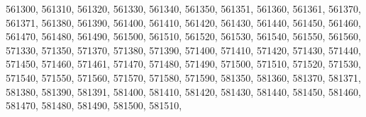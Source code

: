 \textquotesingle{}561300\textquotesingle{}, \textquotesingle{}561310\textquotesingle{}, \textquotesingle{}561320\textquotesingle{}, \textquotesingle{}561330\textquotesingle{}, \textquotesingle{}561340\textquotesingle{}, \textquotesingle{}561350\textquotesingle{}, \textquotesingle{}561351\textquotesingle{}, \textquotesingle{}561360\textquotesingle{}, \textquotesingle{}561361\textquotesingle{}, \textquotesingle{}561370\textquotesingle{}, \textquotesingle{}561371\textquotesingle{}, \textquotesingle{}561380\textquotesingle{}, \textquotesingle{}561390\textquotesingle{}, \textquotesingle{}561400\textquotesingle{}, \textquotesingle{}561410\textquotesingle{}, \textquotesingle{}561420\textquotesingle{}, \textquotesingle{}561430\textquotesingle{}, \textquotesingle{}561440\textquotesingle{}, \textquotesingle{}561450\textquotesingle{}, \textquotesingle{}561460\textquotesingle{}, \textquotesingle{}561470\textquotesingle{}, \textquotesingle{}561480\textquotesingle{}, \textquotesingle{}561490\textquotesingle{}, \textquotesingle{}561500\textquotesingle{}, \textquotesingle{}561510\textquotesingle{}, \textquotesingle{}561520\textquotesingle{}, \textquotesingle{}561530\textquotesingle{}, \textquotesingle{}561540\textquotesingle{}, \textquotesingle{}561550\textquotesingle{}, \textquotesingle{}561560\textquotesingle{}, \textquotesingle{}571330\textquotesingle{}, \textquotesingle{}571350\textquotesingle{}, \textquotesingle{}571370\textquotesingle{}, \textquotesingle{}571380\textquotesingle{}, \textquotesingle{}571390\textquotesingle{}, \textquotesingle{}571400\textquotesingle{}, \textquotesingle{}571410\textquotesingle{}, \textquotesingle{}571420\textquotesingle{}, \textquotesingle{}571430\textquotesingle{}, \textquotesingle{}571440\textquotesingle{}, \textquotesingle{}571450\textquotesingle{}, \textquotesingle{}571460\textquotesingle{}, \textquotesingle{}571461\textquotesingle{}, \textquotesingle{}571470\textquotesingle{}, \textquotesingle{}571480\textquotesingle{}, \textquotesingle{}571490\textquotesingle{}, \textquotesingle{}571500\textquotesingle{}, \textquotesingle{}571510\textquotesingle{}, \textquotesingle{}571520\textquotesingle{}, \textquotesingle{}571530\textquotesingle{}, \textquotesingle{}571540\textquotesingle{}, \textquotesingle{}571550\textquotesingle{}, \textquotesingle{}571560\textquotesingle{}, \textquotesingle{}571570\textquotesingle{}, \textquotesingle{}571580\textquotesingle{}, \textquotesingle{}571590\textquotesingle{}, \textquotesingle{}581350\textquotesingle{}, \textquotesingle{}581360\textquotesingle{}, \textquotesingle{}581370\textquotesingle{}, \textquotesingle{}581371\textquotesingle{}, \textquotesingle{}581380\textquotesingle{}, \textquotesingle{}581390\textquotesingle{}, \textquotesingle{}581391\textquotesingle{}, \textquotesingle{}581400\textquotesingle{}, \textquotesingle{}581410\textquotesingle{}, \textquotesingle{}581420\textquotesingle{}, \textquotesingle{}581430\textquotesingle{}, \textquotesingle{}581440\textquotesingle{}, \textquotesingle{}581450\textquotesingle{}, \textquotesingle{}581460\textquotesingle{}, \textquotesingle{}581470\textquotesingle{}, \textquotesingle{}581480\textquotesingle{}, \textquotesingle{}581490\textquotesingle{}, \textquotesingle{}581500\textquotesingle{}, \textquotesingle{}581510\textquotesingle{}, 